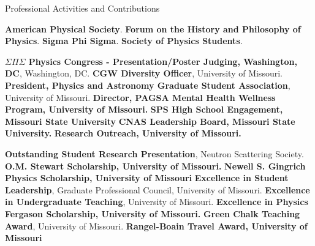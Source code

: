 \begin{rubric}{Professional Activities and Contributions}

\entry*[2019--Present] \textbf{American Physical Society}.
\entry*[2020--Present] \textbf{Forum on the History and Philosophy of Physics}.
\entry*[2022--Present] \textbf{Sigma Phi Sigma}.
\entry*[2017--2021] \textbf{Society of Physics Students}.

\entry*[2022] \textbf{$\Sigma \Pi \Sigma$ Physics Congress - Presentation/Poster Judging, Washington, DC}, Washington, DC.
\entry*[2022--Present] \textbf{CGW Diversity Officer}, University of Missouri.
\entry*[2022--Present] \textbf{President, Physics and Astronomy Graduate Student Association}, University of Missouri.
\entry*[2022-2024] \textbf{Director, PAGSA Mental Health Wellness Program, University of Missouri.}
\entry*[2017-2020] \textbf{SPS High School Engagement, Missouri State University}
\entry*[2018-2019] \textbf{CNAS Leadership Board, Missouri State University.}
\entry*[2022-2024] \textbf{ Research Outreach, University of Missouri.}

\entry*[2023] \textbf{Outstanding Student Research Presentation}, Neutron Scattering Society.
\entry*[2021] \textbf{O.M. Stewart Scholarship, University of Missouri.}
\entry*[2022] \textbf{Newell S. Gingrich Physics Scholarship, University of Missouri}
\entry*[2022] \textbf{Excellence in Student Leadership}, Graduate Professional Council, University of Missouri.
\entry*[2022] \textbf{Excellence in Undergraduate Teaching}, University of Missouri.
\entry*[2023] \textbf{Excellence in Physics Fergason Scholarship, University of Missouri.}
\entry*[2023] \textbf{Green Chalk Teaching Award}, University of Missouri.
\entry*[2023] \textbf{Rangel-Boain Travel Award, University of Missouri}

\end{rubric}


